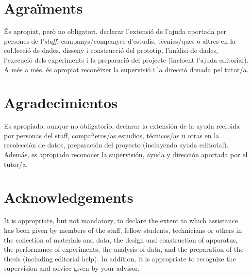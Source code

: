 \clearpage
\ifcase\doclanguage    %
\or
\chapter*{Agraïments}

És apropiat, però no obligatori, declarar l’extensió de l’ajuda aportada per persones de l'\textit{staff}, companys/companyes d’estudis, tècnics/ques o altres en la co\l.lecció de dades, disseny i construcció del prototip, l’anàlisi de dades, l’execució dels experiments i la preparació del projecte (incloent l’ajuda editorial). A més a més, és apropiat reconèixer la supervisió i la direcció donada pel tutor/a.
\or
\chapter*{Agradecimientos}

Es apropiado, aunque no obligatorio, declarar la extensión de la ayuda recibida por personas del staff, compañeros/as estudios, técnicos/as u otras en la recolección de datos, preparación del proyecto (incluyendo ayuda editorial). Además, es apropiado reconocer la supervisión, ayuda y dirección aportada por el tutor/a. 
\else
\chapter*{Acknowledgements}

It is appropriate, but not mandatory, to declare the extent to which assistance has been given by members of the staff, fellow students, technicians or others in the collection of materials and data, the design and construction of apparatus, the performance of experiments, the analysis of data, and the preparation of the thesis (including editorial help). In addition, it is appropriate to recognize the supervision and advice given by your advisor.
\fi
